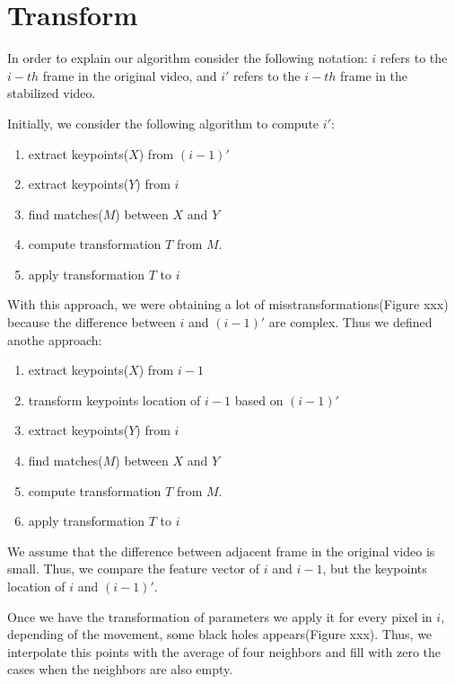 \section{Transform}

In order to explain our algorithm consider the following notation: $i$ refers to the $i-th$ frame in the original video, and $i'$ refers to the $i-th$ frame in the stabilized video.

Initially, we consider the following algorithm to compute $i'$:
\begin{enumerate}
	\item extract keypoints($X$) from $(i-1)'$
	\item extract keypoints($Y$) from $i$
	\item find matches($M$) between $X$ and $Y$
	\item compute transformation $T$ from $M$.
	\item apply transformation $T$ to $i$
\end{enumerate}

With this approach, we were obtaining a lot of misstransformations(Figure xxx) because the difference between $i$ and $(i-1)'$ are complex. Thus we defined anothe approach:   

\begin{enumerate}
	\item extract keypoints($X$) from $i-1$
	\item transform keypoints location of $i-1$ based on $(i-1)'$
	\item extract keypoints($Y$) from $i$
	\item find matches($M$) between $X$ and $Y$
	\item compute transformation $T$ from $M$.
	\item apply transformation $T$ to $i$
\end{enumerate}

We assume that the difference between adjacent frame in the original video is small. Thus, we compare the feature vector of $i$ and $i-1$, but the keypoints location of $i$ and $(i-1)'$.

Once we have the transformation of parameters we apply it for every pixel in $i$, depending of the movement, some black holes appears(Figure xxx). Thus, we interpolate this points with the average of four neighbors and fill with zero the cases when the neighbors are also empty.
